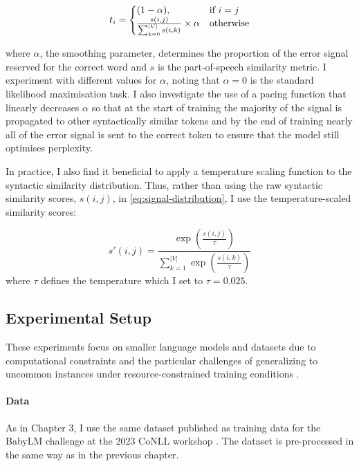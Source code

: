\begin{equation}
\label{eq:signal-distribution}
    t_i=\left\{
  \begin{array}{@{}ll@{}}
    (1-\alpha), & \text{if}\ i=j \\
    \frac{s(i,j)}{\sum_{k=0}^{|V|}{s(i,k)}} \times \alpha & \text{otherwise}
  \end{array}\right.
\end{equation}

\noindent

where $\alpha$, the smoothing parameter, determines the proportion of the error signal reserved for the correct word and $s$ is the part-of-speech similarity metric. I experiment with different values for $\alpha$, noting that $\alpha=0$ is the standard likelihood maximisation task. I also investigate the use of a pacing function that linearly decreases $\alpha$ so that at the start of training the majority of the signal is propagated to other syntactically similar tokens and by the end of training nearly all of the error signal is sent to the correct token to ensure that the model still optimises perplexity. 

In practice, I also find it beneficial to apply a temperature scaling function to the syntactic similarity distribution. Thus, rather than using the raw syntactic similarity scores, $s(i,j)$, in \cref{eq:signal-distribution}, I use the temperature-scaled similarity scores:

$$
s'(i,j) = \frac{\exp\left(\frac{s(i,j)}{\tau}\right)}{\sum_{k=1}^{|V|} \exp\left(\frac{s(i,k)}{\tau}\right)}
$$
where $\tau$ defines the temperature which I set to $\tau=0.025$.

\subsection{Experimental Setup}
\label{subsection:experimental_setup}

These experiments focus on smaller language models and datasets due to computational constraints and the particular challenges of generalizing to uncommon instances under resource-constrained training conditions \citep{warstadt2023babylm1}. 

\paragraph{Data} \label{paragraph:data} As in Chapter 3, I use the same dataset published as training data for the BabyLM challenge at the 2023 CoNLL workshop \citep{warstadt2023babylm1}. The dataset is pre-processed in the same way as in the previous chapter. 

